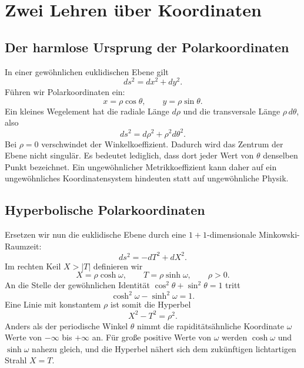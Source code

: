 \section{Zwei Lehren über Koordinaten}

\subsection{Der harmlose Ursprung der Polarkoordinaten}

In einer gewöhnlichen euklidischen Ebene gilt
\begin{equation}
ds^2=dx^2+dy^2.
\end{equation}
Führen wir Polarkoordinaten ein:
\begin{equation}
x=\rho\cos\theta,
\qquad
y=\rho\sin\theta .
\end{equation}
Ein kleines Wegelement hat die radiale Länge \(d\rho\) und die transversale Länge \(\rho\,d\theta\), also
\begin{equation}
ds^2=d\rho^2+\rho^2d\theta^2.
\label{eq:l03-polar}
\end{equation}
Bei \(\rho=0\) verschwindet der Winkelkoeffizient. Dadurch wird das Zentrum der Ebene nicht singulär. Es bedeutet lediglich, dass dort jeder Wert von \(\theta\) denselben Punkt bezeichnet. Ein ungewöhnlicher Metrikkoeffizient kann daher auf ein ungewöhnliches Koordinatensystem hindeuten statt auf ungewöhnliche Physik.

\subsection{Hyperbolische Polarkoordinaten}

Ersetzen wir nun die euklidische Ebene durch eine \(1+1\)-dimensionale Minkowski-Raumzeit:
\begin{equation}
ds^2=-dT^2+dX^2.
\end{equation}
Im rechten Keil \(X>|T|\) definieren wir
\begin{equation}
X=\rho\cosh\omega,
\qquad
T=\rho\sinh\omega,
\qquad \rho>0 .
\label{eq:l03-rindler-transform}
\end{equation}
An die Stelle der gewöhnlichen Identität \(\cos^2\theta+\sin^2\theta=1\) tritt
\begin{equation}
\cosh^2\omega-\sinh^2\omega=1.
\end{equation}
Eine Linie mit konstantem \(\rho\) ist somit die Hyperbel
\begin{equation}
X^2-T^2=\rho^2.
\end{equation}
Anders als der periodische Winkel \(\theta\) nimmt die rapiditätsähnliche Koordinate \(\omega\) Werte von \(-\infty\) bis \(+\infty\) an. Für große positive Werte von \(\omega\) werden \(\cosh\omega\) und \(\sinh\omega\) nahezu gleich, und die Hyperbel nähert sich dem zukünftigen lichtartigen Strahl \(X=T\).

